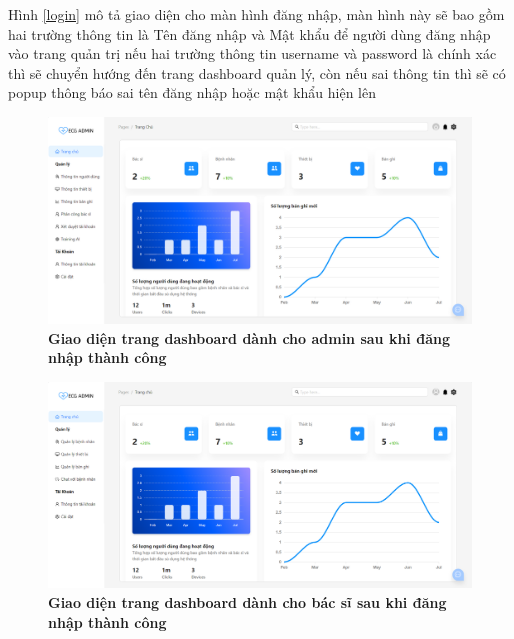 Hình \ref{login} mô tả giao diện cho màn hình đăng nhập, màn hình này sẽ bao
 gồm hai trường thông tin là Tên đăng nhập và Mật khẩu để người dùng đăng nhập vào trang quản trị
 nếu hai trường thông tin username và password là chính xác thì sẽ chuyển hướng đến trang dashboard 
 quản lý, còn nếu sai thông tin thì sẽ có popup thông báo sai tên đăng nhập hoặc mật khẩu hiện lên

 \begin{figure}[H]
  \centering
  \includegraphics[scale=0.4]{Images/server/webUI/dashboard_admin.png}
  \caption[Giao diện trang dashboard dành cho admin sau khi đăng nhập thành công]{\bfseries \fontsize{12pt}{0pt}\selectfont Giao diện trang dashboard dành cho admin sau khi đăng nhập thành công}
  \label{dashboard_admin} %
\end{figure}

\begin{figure}[H]
  \centering
  \includegraphics[scale=0.4]{Images/server/webUI/dashboard_doctor.png}
  \caption[Giao diện trang dashboard dành cho bác sĩ sau khi đăng nhập thành công]{\bfseries \fontsize{12pt}{0pt}\selectfont Giao diện trang dashboard dành cho bác sĩ sau khi đăng nhập thành công}
  \label{dashboard_doctor} %
\end{figure}

